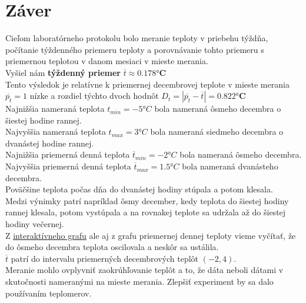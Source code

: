 \documentclass{article}
\begin{document}
	\section{Záver}	
		Cieľom laboratórneho protokolu bolo meranie teploty v priebehu týždňa, počítanie týždenného priemeru teploty a porovnávanie tohto priemeru s priemernou teplotou v danom mesiaci v mieste merania.\\
		Vyšiel nám \textbf{týždenný priemer} $\overline{t} \approx \mathbf{0.178 °C}$\\
		Tento výsledok je relatívne k priemernej decembrovej teplote v mieste merania $\overline{p_t} = 1$ nízke a rozdiel týchto dvoch hodnôt $D_t = | \overline{p_t}-\overline{t}| = \mathbf{0.822 °C}$\\
		Najnižšia nameraná teplota $t_{min} = -5 °C$ bola nameraná ôsmeho decembra o šiestej hodine rannej.\\
		Najvyššia nameraná teplota $t_{max} = 3 °C $ bola nameraná siedmeho decembra o dvanástej hodine rannej.\\
		Najnižšia priemerná denná teplota $\overline{t}_{min} = -2 °C$ bola nameraná ôsmeho decembra.\\
		Najvyššia priemerná denná teplota $\overline{t}_{max} = 1.5 °C$ bola nameraná dvanásteho decembra.\\
		Poväčšine teplota počas dňa do dvanástej hodiny stúpala a potom klesala.\\
		Medzi výnimky patrí napríklad ôsmy december, kedy teplota do šiestej hodiny rannej klesala, potom vystúpala a na rovnakej teplote sa udržala až do šiestej hodiny večernej.\\
		Z \href{https://www.gtsforum.xyz/teploty}{interaktívneho grafu} ale aj z grafu priemernej dennej teploty vieme vyčítať, že do ôsmeho decembra teplota oscilovala a neskôr sa ustálila.\\
		$\overline{t}$ patrí do intervalu priemerných decembrových teplôt $\left(-2,4\right)$.\\
		Meranie mohlo ovplyvniť zaokrúhľovanie teplôt a to, že dáta neboli dátami v skutočnosti nameranými na mieste merania.
		Zlepšiť experiment by sa dalo používaním teplomerov.

		




	
\end{document}
